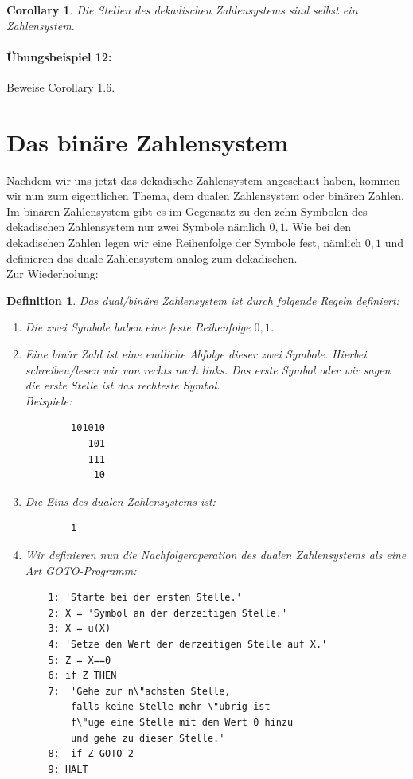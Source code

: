 \documentclass[11pt,a4paper,leqno]{report}
\newtheorem{definition}[theorem]{Definition}
\newtheorem{corollary}[theorem]{Corollary}
\numberwithin{equation}{chapter}
\begin{document}
\begin{corollary}
	Die Stellen des dekadischen Zahlensystems sind selbst ein Zahlensystem.
\end{corollary}
\paragraph{\"Ubungsbeispiel 12:} Beweise Corollary 1.6.
\section{Das bin\"are Zahlensystem}
Nachdem wir uns jetzt das dekadische Zahlensystem angeschaut haben, kommen wir nun zum eigentlichen Thema, dem dualen Zahlensystem oder bin\"aren Zahlen. Im bin\"aren Zahlensystem gibt es im Gegensatz zu den zehn Symbolen des dekadischen Zahlensystem nur zwei Symbole n\"amlich ${0, 1}$. Wie bei den dekadischen Zahlen legen wir eine Reihenfolge der Symbole fest, n\"amlich $0, 1$ und definieren das duale Zahlensystem analog zum dekadischen.\\
Zur Wiederholung: 
\begin{definition}
	Das dual/bin\"are Zahlensystem ist durch folgende Regeln definiert:
	\begin{enumerate}
		\item Die zwei Symbole haben eine feste Reihenfolge $0, 1$.
		\item Eine bin\"ar Zahl ist eine endliche Abfolge dieser zwei Symbole. Hierbei schreiben/lesen wir von rechts nach links. Das erste Symbol oder wir sagen die erste Stelle ist das rechteste Symbol. \\Beispiele:
		\begin{lstlisting}
		101010
		   101
		   111
		    10
		\end{lstlisting}
		\item Die Eins des dualen Zahlensystems ist:
		\begin{lstlisting}
		1
		\end{lstlisting}
		\item Wir definieren nun die Nachfolgeroperation des dualen Zahlensystems als eine Art GOTO-Programm:
			\begin{lstlisting}
	1: 'Starte bei der ersten Stelle.'
	2: X = 'Symbol an der derzeitigen Stelle.'
	3: X = u(X)
	4: 'Setze den Wert der derzeitigen Stelle auf X.'
	5: Z = X==0
	6: if Z THEN
	7: 	'Gehe zur n\"achsten Stelle, 
		falls keine Stelle mehr \"ubrig ist 
		f\"uge eine Stelle mit dem Wert 0 hinzu
		und gehe zu dieser Stelle.'
	8:	if Z GOTO 2
	9: HALT
			\end{lstlisting}
	\end{enumerate}
\end{definition}
\end{document}
